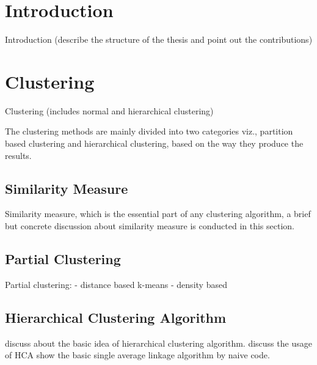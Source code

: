 \documentclass[utf8,english]{gradu3}
\begin{document}
\mainmatter

\chapter{Introduction}

Introduction (describe the structure of the thesis and point out the contributions)

\chapter{Clustering}

Clustering (includes normal and hierarchical clustering)

The clustering methods are mainly divided into two categories viz., partition based clustering and hierarchical clustering, based on the way they produce the results.

\section{Similarity Measure}

Similarity measure, which is the essential part of any clustering algorithm, a brief but concrete discussion about similarity measure is conducted in this section.

\section{Partial Clustering}

Partial clustering:
- distance based 
	k-means
- density based

\section{Hierarchical Clustering Algorithm}

discuss about the basic idea of hierarchical clustering algorithm.
discuss the usage of HCA
show the basic single  average linkage algorithm by naive code.
\end{document}
